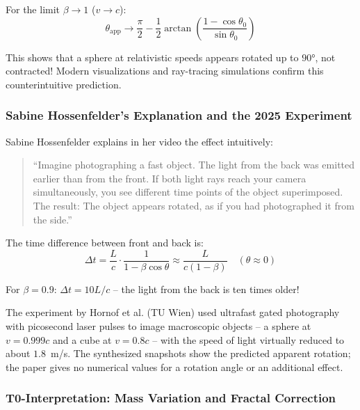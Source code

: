 	For the limit $\beta \to 1$ ($v \to c$):
	\begin{equation}
		\theta_{\text{app}} \to \frac{\pi}{2} - \frac{1}{2}\arctan\left(\frac{1-\cos\theta_0}{\sin\theta_0}\right)
	\end{equation}
	
	This shows that a sphere at relativistic speeds appears rotated up to $90°$, not contracted! Modern visualizations \cite{weiskopf2000, mueller2014} and ray-tracing simulations confirm this counterintuitive prediction.
	
	\subsubsection{Sabine Hossenfelder's Explanation and the 2025 Experiment}
	
	Sabine Hossenfelder explains in her video \cite{hossenfelder2025} the effect intuitively:
	
	\begin{quote}
		``Imagine photographing a fast object. The light from the back was emitted earlier than from the front. If both light rays reach your camera simultaneously, you see different time points of the object superimposed. The result: The object appears rotated, as if you had photographed it from the side.''
	\end{quote}
	
	The time difference between front and back is:
	\begin{equation}
		\Delta t = \frac{L}{c} \cdot \frac{1}{1-\beta\cos\theta} \approx \frac{L}{c(1-\beta)} \quad (\theta \approx 0)
	\end{equation}
	
	For $\beta = 0.9$: $\Delta t = 10L/c$ – the light from the back is ten times older!
	
	The experiment by Hornof et al. (TU Wien) \cite{terrell2025} used ultrafast gated photography with picosecond laser pulses to image macroscopic objects -- a sphere at $v = 0.999c$ and a cube at $v = 0.8c$ -- with the speed of light virtually reduced to about $1.8$~m/s. The synthesized snapshots show the predicted apparent rotation; the paper gives no numerical values for a rotation angle or an additional effect.
	
	\subsubsection{T0-Interpretation: Mass Variation and Fractal Correction}
	
